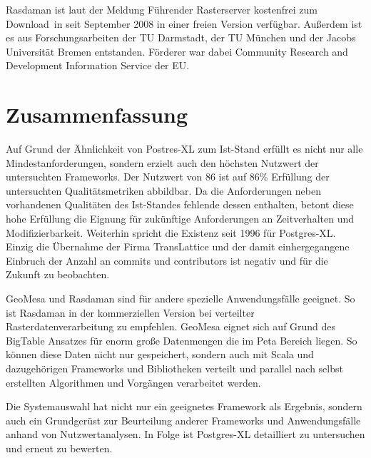 Rasdaman ist laut der Meldung \glqq Führender Rasterserver kostenfrei zum Download\grqq\ in \cite{website:rasdaman-newsarchive} seit September 2008 in einer freien Version verfügbar.
Außerdem ist es aus Forschungsarbeiten der TU Darmstadt, der TU München und der Jacobs Universität Bremen entstanden.
Förderer war dabei Community Research and Development Information Service der EU. \cite{website:rasdaman-cordis}

\section{Zusammenfassung}
Auf Grund der Ähnlichkeit von Postres-XL zum Ist-Stand erfüllt es nicht nur alle Mindestanforderungen, sondern erzielt auch den höchsten Nutzwert der untersuchten Frameworks.
Der Nutzwert von 86 ist auf 86\% Erfüllung der untersuchten Qualitätsmetriken abbildbar.
Da die Anforderungen neben vorhandenen Qualitäten des Ist-Standes fehlende dessen enthalten, betont diese hohe Erfüllung die Eignung für zukünftige Anforderungen an Zeitverhalten und Modifizierbarkeit.
Weiterhin spricht die Existenz seit 1996 für Postgres-XL.
Einzig die Übernahme der Firma TransLattice und der damit einhergegangene Einbruch der Anzahl an commits und contributors ist negativ und für die Zukunft zu beobachten.

GeoMesa und Rasdaman sind für andere spezielle Anwendungsfälle geeignet.
So ist Rasdaman in der kommerziellen Version bei verteilter Rasterdatenverarbeitung zu empfehlen.
GeoMesa eignet sich auf Grund des BigTable Ansatzes für enorm große Datenmengen die im Peta Bereich liegen.
So können diese Daten nicht nur gespeichert, sondern auch mit Scala und dazugehörigen Frameworks und Bibliotheken verteilt und parallel nach selbst erstellten Algorithmen und Vorgängen verarbeitet werden.

Die Systemauswahl hat nicht nur ein geeignetes Framework als Ergebnis, sondern auch ein Grundgerüst zur Beurteilung anderer Frameworks und Anwendungsfälle anhand von Nutzwertanalysen.
In Folge ist Postgres-XL detailliert zu untersuchen und erneut zu bewerten.
